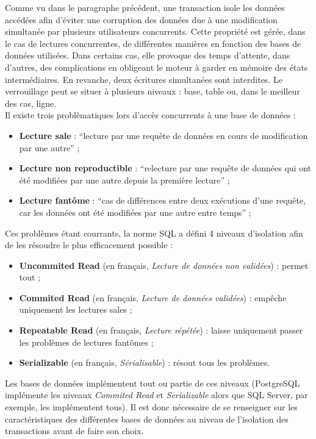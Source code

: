	Comme vu dans le paragraphe précédent, une transaction isole les données accédées afin d'éviter une corruption des données due à une modification simultanée par plusieurs utilisateurs concurrents. Cette propriété est gérée, dans le cas de lectures concurrentes, de différentes manières en fonction des bases de données utilisées. Dans certains cas, elle provoque des temps d'attente, dans d'autres, des complications en obligeant le moteur à garder en mémoire des états intermédiaires. En revanche, deux écritures simultanées sont interdites. Le verrouillage peut se situer à plusieurs niveaux : base, table ou, dans le meilleur des cas, ligne.\\

	Il existe trois problèmatiques lors d'accès concurrents à une base de données :
	\vspace{10px}
	\begin{itemize}
		\item \textbf{Lecture sale} : \enquote{lecture par une requête de données en cours de modification par une autre}\cite{wiktionnaireLectureSale} ;
		\item \textbf{Lecture non reproductible} : \enquote{relecture par une requête de données qui ont été modifiées par une autre depuis la première lecture}\cite{wiktionnaireLectureNonReproductible} ;
		\item \textbf{Lecture fantôme} : \enquote{cas de différences entre deux exécutions d'une requête, car les données ont été modifiées par une autre entre temps}\cite{wiktionnaireLectureFantome} ;
	\end{itemize}
	\vspace{10px}

	 Ces problèmes étant courrants, la norme SQL a défini 4 niveaux d'isolation afin de les résoudre le plus efficacement possible :
	\vspace{10px}
	\begin{itemize}
		\item \textbf{Uncommited Read} (en français, \textit{Lecture de données non validées}) : permet tout ;
		\item \textbf{Commited Read} (en français, \textit{Lecture de données validées}) : empêche uniquement les lectures sales ;
		\item \textbf{Repeatable Read} (en français, \textit{Lecture répétée}) : laisse uniquement passer les problèmes de lectures fantômes ;
		\item \textbf{Serializable} (en français, \textit{Sérialisable}) : résout tous les problèmes.
	\end{itemize}
	\vspace{20px}
	 Les bases de données implémentent tout ou partie de ces niveaux (PostgreSQL implémente les niveaux \textit{Commited Read} et \textit{Serializable}\cite{isolationTransactionPostgre} alors que SQL Server, par exemple, les implémentent tous\cite{isolationTransactionSQLServer}). Il est donc nécessaire de se renseigner sur les caractéristiques des différentes bases de données au niveau de l'isolation des transactions avant de faire son choix.\\

